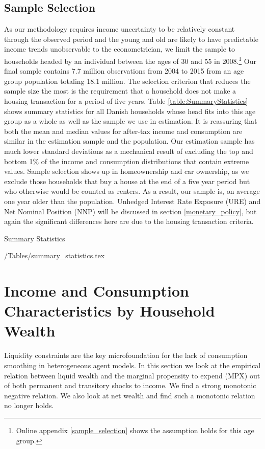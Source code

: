 \documentclass[titlepage]{\econtex}\newcommand{\texname}{ConsumptionHeterogeneity}
\begin{document}
	\subsection{Sample Selection}
	As our methodology requires income uncertainty to be relatively constant through the observed period and the young and old are likely to have predictable income trends unobservable to the econometrician, we limit the sample to households headed by an individual between the ages of 30 and 55 in 2008.\footnote{Online appendix \ref{sample_selection} shows the assumption holds for this age group.} Our final sample contains 7.7 million observations from 2004 to 2015 from an age group population totaling 18.1 million. The selection criterion that reduces the sample size the most is the requirement that a household does not make a housing transaction for a period of five years. Table \ref{table:SummaryStatistics} shows summary statistics for all Danish households whose head fits into this age group as a whole as well as the sample we use in estimation. It is reassuring that both the mean and median values for after-tax income and consumption are similar in the estimation sample and the population. Our estimation sample has much lower standard deviations as a mechanical result of excluding the top and bottom 1\% of the income and consumption distributions that contain extreme values. Sample selection shows up in homeownership and car ownership, as we exclude those households that buy a house at the end of a five year period but who otherwise would be counted as renters. As a result, our sample is, on average one year older than the population. Unhedged Interest Rate Exposure (URE) and Net Nominal Position (NNP) will be discussed in section \ref{monetary_policy}, but again the significant differences here are due to the housing transaction criteria. 
	\begin{center} 
		\begin{table}
			\caption{Summary Statistics}
			\label{table:SummaryStatistics}
			\econtexRoot/Tables/summary_statistics.tex 
		\end{table}
	\end{center}
	
	\section{Income and Consumption Characteristics by Household Wealth} \label{MPX_wealth}
	Liquidity constraints are the key microfoundation for the lack of consumption smoothing in heterogeneous agent models. In this section we look at the empirical relation between liquid wealth and the marginal propensity to expend (MPX) out of both permanent and transitory shocks to income. We find a strong monotonic negative relation. We also look at net wealth and find such a monotonic relation no longer holds.
	
\end{document}
